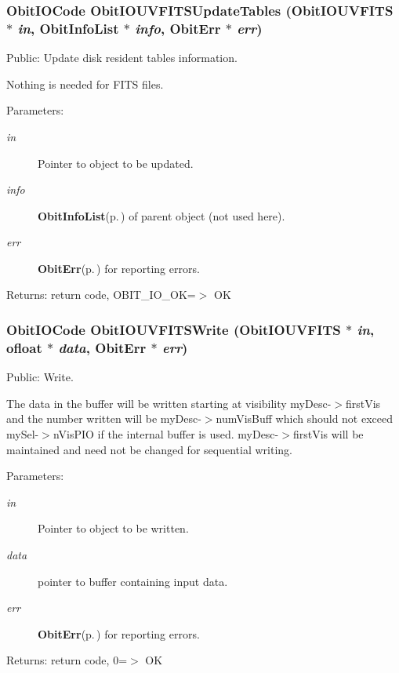 \subsubsection{\setlength{\rightskip}{0pt plus 5cm}Obit\-IOCode Obit\-IOUVFITSUpdate\-Tables ({\bf Obit\-IOUVFITS} $\ast$ {\em in}, {\bf Obit\-Info\-List} $\ast$ {\em info}, {\bf Obit\-Err} $\ast$ {\em err})}\label{ObitIOUVFITS_8c_a39}


Public: Update disk resident tables information. 

Nothing is needed for FITS files. \begin{Desc}
\item[Parameters:]
\begin{description}
\item[{\em in}]Pointer to object to be updated. \item[{\em info}]{\bf Obit\-Info\-List}{\rm (p.\,\pageref{structObitInfoList})} of parent object (not used here). \item[{\em err}]{\bf Obit\-Err}{\rm (p.\,\pageref{structObitErr})} for reporting errors. \end{description}
\end{Desc}
\begin{Desc}
\item[Returns:]return code, OBIT\_\-IO\_\-OK=$>$ OK \end{Desc}
\subsubsection{\setlength{\rightskip}{0pt plus 5cm}Obit\-IOCode Obit\-IOUVFITSWrite ({\bf Obit\-IOUVFITS} $\ast$ {\em in}, {\bf ofloat} $\ast$ {\em data}, {\bf Obit\-Err} $\ast$ {\em err})}\label{ObitIOUVFITS_8c_a33}


Public: Write. 

The data in the buffer will be written starting at visibility my\-Desc-$>$first\-Vis and the number written will be my\-Desc-$>$num\-Vis\-Buff which should not exceed my\-Sel-$>$n\-Vis\-PIO if the internal buffer is used. my\-Desc-$>$first\-Vis will be maintained and need not be changed for sequential writing. \begin{Desc}
\item[Parameters:]
\begin{description}
\item[{\em in}]Pointer to object to be written. \item[{\em data}]pointer to buffer containing input data. \item[{\em err}]{\bf Obit\-Err}{\rm (p.\,\pageref{structObitErr})} for reporting errors. \end{description}
\end{Desc}
\begin{Desc}
\item[Returns:]return code, 0=$>$ OK \end{Desc}
